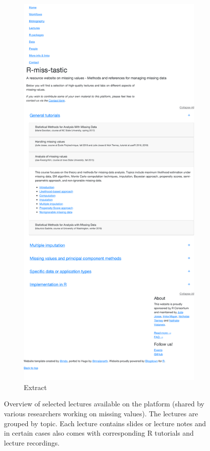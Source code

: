 \begin{figure}
\begin{center}
\begin{subfigure}[b]{0.36\textwidth}
\includegraphics[width=\textwidth]{figures/local-lectures-1.pdf}
\caption{Extract}
\end{subfigure}
\end{center}
\caption{Overview of selected lectures available on the platform (shared by various researchers working on missing values). The lectures are grouped by topic. Each lecture contains slides or lecture notes and in certain cases also comes with corresponding R tutorials and lecture recordings.\label{fig:lectures}}
\end{figure}

